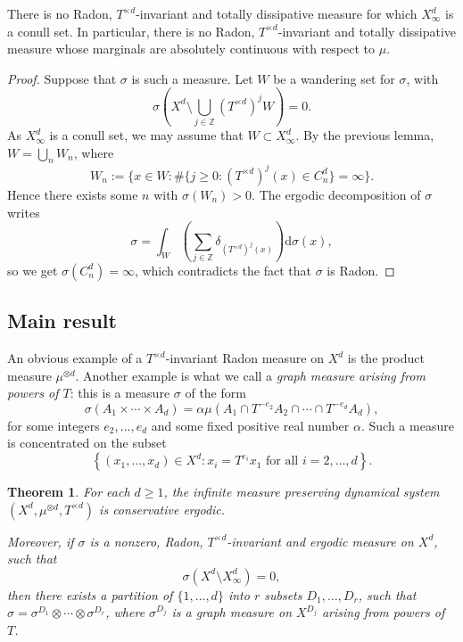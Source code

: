 \documentclass[10pt]{amsart}
\newtheorem{theo}{Theorem}[section]
\theoremstyle{definition}\newtheorem{defi}[theo]{Definition}\newtheorem{rema}[theo]{Remark}\newtheorem{exam}[theo]{Example}\newtheorem{exem}[theo]{Example}\newtheorem{nota}[theo]{Notation}
\newcommand{\egdef}{:=}
\newcommand{\ZZ}{\mathbb{Z}}
\newcommand{\td}{T^{\times d}}
\newcommand*{\dd}{\mathrm{d}}
\newcommand*{\dsigma}{\dd\sigma}
\begin{document}
\begin{prop}\label{prop:dissipative}
There is no Radon, $\td$-invariant and totally dissipative measure for which $X_\infty^d$ is a conull set. In particular, there is no Radon, $\td$-invariant and totally dissipative measure whose marginals are absolutely continuous with respect to $\mu$.
\end{prop}

\begin{proof}
Suppose that $\sigma$ is such a measure. Let $W$ be a wandering set for $\sigma$, with
\[
\sigma\left(X^d\setminus\bigcup_{j\in\ZZ}(\td)^jW\right)=0.
\]
As $X_\infty^d$ is a conull set, we may assume that $W\subset X_\infty^d$. By the previous lemma, $W=\bigcup_{n}W_n$, where
\[
W_n\egdef \bigl\{ x\in W: \#\{j\ge0: (\td)^j(x)\in C_{n}^d\} = \infty
\bigr\}.
\]
Hence there exists some $n$ with $\sigma(W_n)>0$. The ergodic decomposition of $\sigma$ writes
\[
\sigma = \int_W \left(\sum_{j\in\ZZ}\delta_{(\td)^j(x)}\right) \dsigma(x),
\]
so we get $\sigma(C_n^d)=\infty$, which contradicts the fact that $\sigma$ is Radon.
\end{proof}

\subsection{Main result}\label{sec:main}

An obvious example of a $\td$-invariant Radon measure on $X^d$ is the product measure $\mu^{\otimes d}$. Another example is what we call a \emph{graph measure arising from powers of $T$}: this is a measure $\sigma$ of the form
\begin{equation}\label{eq:graph_measure}
\sigma(A_1\times\cdots\times A_d) = \alpha\mu(A_1\cap T^{-e_2}A_2\cap\cdots\cap T^{-e_d}A_d),
\end{equation}
for some integers $e_2,\ldots,e_d$ and some fixed positive real number $\alpha$. Such a measure is concentrated on the subset
\[
\left\{(x_1,\ldots,x_d)\in X^d: x_i=T^{e_i}x_1 \text{ for all }i=2,\ldots,d\right\}.
\]


\begin{theo}\label{thm:msj}
For each $d\ge1$, the infinite measure preserving dynamical system $(X^d,
\mu^{\otimes d},\td)$ is conservative ergodic.

Moreover, if $\sigma$ is a nonzero, Radon, $\td$-invariant and ergodic measure on $X^d$, such that
\begin{equation}\label{eq:weaker}
\sigma \left(X^d \setminus X_\infty^d\right)=0,
\end{equation}
then there exists a partition of $\{1,\ldots,d\}$ into $r$ subsets $D_1,\ldots,D_r$, such that $\sigma=\sigma^{D_1}\otimes \cdots\otimes \sigma^{D_r}$, where $\sigma^{D_j}$ is a graph measure on $X^{D_j}$ arising from powers of~$T$.
\end{theo}
\end{document}
